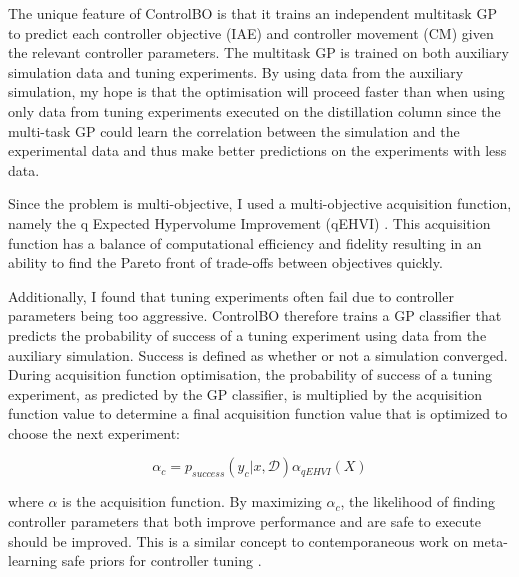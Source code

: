 The unique feature of ControlBO is that it trains an independent multitask GP to predict each controller objective (IAE) and controller movement (CM) given the relevant controller parameters. The multitask GP is trained on both auxiliary simulation data and tuning experiments. By using data from the auxiliary simulation, my hope is that the optimisation will proceed faster than when using only data from tuning experiments executed on the distillation column since the multi-task GP could learn the correlation between the simulation and the experimental data and thus make better predictions on the experiments with less data.

Since the problem is multi-objective, I used a multi-objective acquisition function, namely the q Expected Hypervolume Improvement (qEHVI) \cite{Balandat2020}. This acquisition function has a balance of computational efficiency and fidelity resulting in an ability to find the Pareto front of trade-offs between objectives quickly. 

Additionally, I found that tuning experiments often fail due to controller parameters being too aggressive. ControlBO therefore trains a GP classifier that predicts the probability of success of a tuning experiment using data from the auxiliary simulation. Success is defined as whether or not a simulation converged. During acquisition function optimisation, the probability of success of a tuning experiment, as predicted by the GP classifier, is multiplied by the acquisition function value to determine a final acquisition function value that is optimized to choose the next experiment:

\begin{equation}
    \alpha_{c} = p_{success}(y_c \vert x, \mathcal D) \alpha_{qEHVI}(X)
\end{equation}

where $\alpha$ is the acquisition function. By maximizing $\alpha_c$, the likelihood of finding controller parameters that both improve performance and are safe to execute should be improved. This is a similar concept to contemporaneous work on meta-learning safe priors for controller tuning \cite{Rothfuss2023}. 


